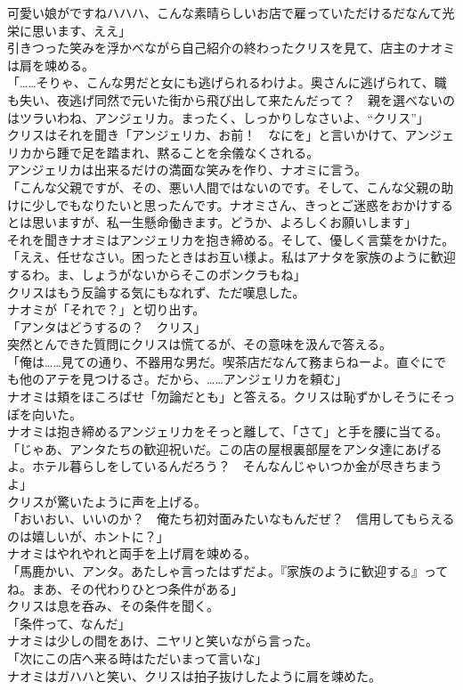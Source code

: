 \documentclass[b5j,10pt,openany]{jsbook}
\begin{document}
可愛い娘がですねハハハ、こんな素晴らしいお店で雇っていただけるだなんて光栄に思います、ええ」\\引きつった笑みを浮かべながら自己紹介の終わったクリスを見て、店主のナオミは肩を竦める。\\「\ldots{}\ldots{}そりゃ、こんな男だと女にも逃げられるわけよ。奥さんに逃げられて、職も失い、夜逃げ同然で元いた街から飛び出して来たんだって？　親を選べないのはツラいわね、アンジェリカ。まったく、しっかりしなさいよ、``クリス''」\\クリスはそれを聞き「アンジェリカ、お前！　なにを」と言いかけて、アンジェリカから踵で足を踏まれ、黙ることを余儀なくされる。\\アンジェリカは出来るだけの満面な笑みを作り、ナオミに言う。\\「こんな父親ですが、その、悪い人間ではないのです。そして、こんな父親の助けに少しでもなりたいと思ったんです。ナオミさん、きっとご迷惑をおかけするとは思いますが、私一生懸命働きます。どうか、よろしくお願いします」\\それを聞きナオミはアンジェリカを抱き締める。そして、優しく言葉をかけた。\\「ええ、任せなさい。困ったときはお互い様よ。私はアナタを家族のように歓迎するわ。ま、しょうがないからそこのボンクラもね」\\クリスはもう反論する気にもなれず、ただ嘆息した。\\ナオミが「それで？」と切り出す。\\「アンタはどうするの？　クリス」\\突然とんできた質問にクリスは慌てるが、その意味を汲んで答える。\\「俺は\ldots{}\ldots{}見ての通り、不器用な男だ。喫茶店だなんて務まらねーよ。直ぐにでも他のアテを見つけるさ。だから、\ldots{}\ldots{}アンジェリカを頼む」\\ナオミは頬をほころばせ「勿論だとも」と答える。クリスは恥ずかしそうにそっぽを向いた。\\ナオミは抱き締めるアンジェリカをそっと離して、「さて」と手を腰に当てる。\\「じゃあ、アンタたちの歓迎祝いだ。この店の屋根裏部屋をアンタ達にあげるよ。ホテル暮らしをしているんだろう？　そんなんじゃいつか金が尽きちまうよ」\\クリスが驚いたように声を上げる。\\「おいおい、いいのか？　俺たち初対面みたいなもんだぜ？　信用してもらえるのは嬉しいが、ホントに？」\\ナオミはやれやれと両手を上げ肩を竦める。\\「馬鹿かい、アンタ。あたしゃ言ったはずだよ。『家族のように歓迎する』ってね。まあ、その代わりひとつ条件がある」\\クリスは息を呑み、その条件を聞く。\\「条件って、なんだ」\\ナオミは少しの間をあけ、ニヤリと笑いながら言った。\\「次にこの店へ来る時はただいまって言いな」\\ナオミはガハハと笑い、クリスは拍子抜けしたように肩を竦めた。
\end{document}
